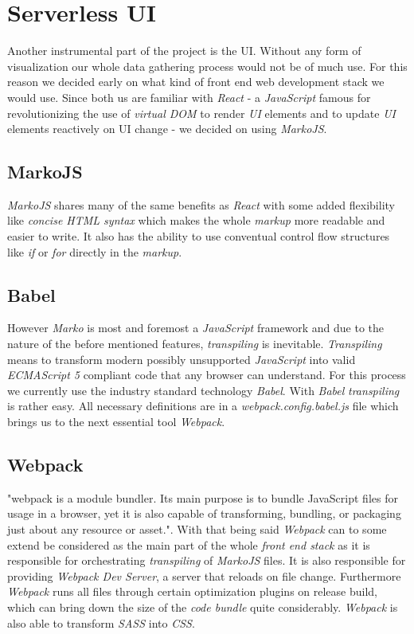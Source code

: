 \section{Serverless UI}

Another instrumental part of the project is the UI. Without any form of
visualization our whole data gathering process would not be of much use.
For this reason we decided early on what kind of front end web development stack
we would use. Since both us are familiar with \textit{React} - a
\textit{JavaScript} famous for revolutionizing the use of \textit{virtual DOM}
to render \textit{UI} elements and to update \textit{UI} elements reactively on
UI change - we decided on using \textit{MarkoJS}.

\subsection{MarkoJS}

\textit{MarkoJS} shares many of the same benefits as \textit{React} with some
added flexibility like \textit{concise HTML syntax} which makes the whole
\textit{markup} more readable and easier to write. It also has the ability to use
conventual control flow structures like \textit{if} or \textit{for} directly in
the \textit{markup}.

\subsection{Babel}

However \textit{Marko} is most and foremost a
\textit{JavaScript} framework and due to the nature of the before mentioned
features, \textit{transpiling} is inevitable. \textit{Transpiling} means to
transform modern possibly unsupported \textit{JavaScript} into valid
\textit{ECMAScript 5} compliant code that any browser can understand. For this
process we currently use the industry standard technology \textit{Babel}. With
\textit{Babel} \textit{transpiling} is rather easy. All necessary definitions
are in a \textit{webpack.config.babel.js} file which brings us to the next
essential tool \textit{Webpack}.

\subsection{Webpack}

"webpack is a module bundler. Its main purpose
is to bundle JavaScript files for usage in a browser, yet it is also capable of
transforming, bundling, or packaging just about any resource or asset.". With
that being said \textit{Webpack} can to some extend be considered as the main part of the whole
\textit{front end stack} as it is responsible for orchestrating \textit{transpiling} of
\textit{MarkoJS} files. It is also responsible for providing \textit{Webpack Dev
Server}, a server that reloads on file change. Furthermore \textit{Webpack} runs
all files through certain optimization plugins on release build, which can bring
down the size of the \textit{code bundle} quite considerably. \textit{Webpack}
is also able to transform \textit{SASS} into \textit{CSS}.

